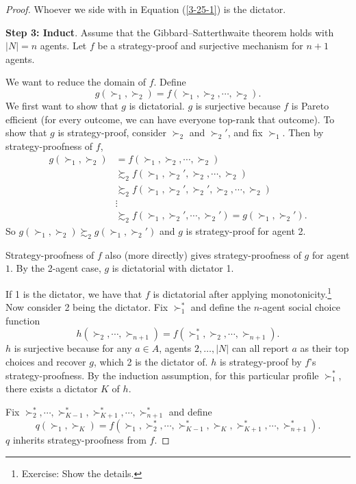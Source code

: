 \begin{proof}
	Whoever we side with in Equation (\ref{3-25-1})	is the dictator.

	\textbf{Step 3: Induct}.
	Assume that the Gibbard--Satterthwaite theorem holds with $\left| N \right| = n$ agents. 
	Let $f$ be a strategy-proof and surjective mechanism for $n+1$ agents. 

	We want to reduce the domain of $f$. Define \[
		g\left( \succ_1, \succ_2 \right) = f\left( \succ_1, \succ_2, \cdots, \succ_2 \right)
	.\]
	We first want to show that $g$ is dictatorial. $g$ is surjective because $f$ is Pareto efficient (for every outcome, we can have everyone top-rank that outcome).
	To show that $g$ is strategy-proof, consider $\succ_2$ and $\succ_2'$, and fix $\succ_1$. Then by strategy-proofness of $f$,
	\begin{align*}
		g\left( \succ_1,\succ_2 \right)&= f\left( \succ_1,\succ_2, \cdots, \succ_2 \right) \\
									   &\succsim_2 f\left( \succ_1, \succ_2', \succ_2, \cdots, \succ_2 \right)\\
									   &\succsim_2 f\left( \succ_1, \succ_2', \succ_2', \succ_2, \cdots, \succ_2 \right) \\
									   &\vdots \\
									   &\succsim_2 f(\succ_1, \succ_2', \cdots, \succ_2') = g(\succ_1,\succ_2')
	.\end{align*}
	So $g(\succ_1,\succ_2) \succsim_2 g\left( \succ_1,\succ_2' \right)$ and $g$ is strategy-proof for agent 2.

	Strategy-proofness of $f$ also (more directly) gives strategy-proofness of $g$ for agent $1$. By the 2-agent case, $g$ is dictatorial with dictator 1.

	If 1 is the dictator, we have that $f$ is dictatorial after applying monotonicity.\footnote{Exercise: Show the details.}
	Now consider 2 being the dictator. Fix $\succ_1^*$ and define the $n$-agent social choice function \[
		h\left( \succ_2, \cdots, \succ_{n+1} \right) = f\left( \succ_1^*, \succ_2, \cdots, \succ_{n+1} \right)
	.\] $h$ is surjective because for any $a \in A$, agents $2,\ldots,\left| N \right|$ can all report $a$ as their top choices and recover $g$, which 2 is the dictator of. $h$ is strategy-proof by $f$'s strategy-proofness.
	By the induction assumption, for this particular profile $\succ_1^*$, there exists a dictator $K$ of $h$. 

	Fix $\succ_2^*, \cdots, \succ_{K-1}^*, \succ_{K+1}^*, \cdots, \succ_{n+1}^*$ and define \[
		q\left( \succ_1, \succ_K \right) = f\left( \succ_1, \succ_2^*, \cdots, \succ_{K-1}^*, \succ_K, \succ_{K+1}^*, \cdots, \succ_{n+1}^* \right)
	.\] $q$ inherits strategy-proofness from $f$.


\end{proof}
